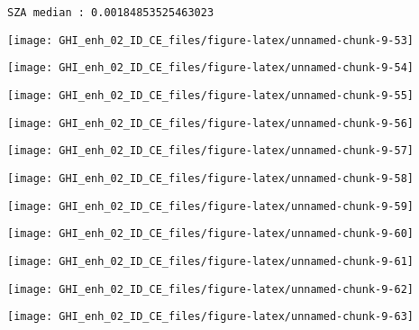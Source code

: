 \documentclass[
  10pt,
  a4paper,oneside]{article}
\begin{document}
\begin{verbatim}
SZA median : 0.00184853525463023 
\end{verbatim}

\begin{center}\texttt{[image: GHI\_enh\_02\_ID\_CE\_files/figure-latex/unnamed-chunk-9-53]} \end{center}

\begin{center}\texttt{[image: GHI\_enh\_02\_ID\_CE\_files/figure-latex/unnamed-chunk-9-54]} \end{center}

\begin{center}\texttt{[image: GHI\_enh\_02\_ID\_CE\_files/figure-latex/unnamed-chunk-9-55]} \end{center}

\begin{center}\texttt{[image: GHI\_enh\_02\_ID\_CE\_files/figure-latex/unnamed-chunk-9-56]} \end{center}

\begin{center}\texttt{[image: GHI\_enh\_02\_ID\_CE\_files/figure-latex/unnamed-chunk-9-57]} \end{center}

\begin{center}\texttt{[image: GHI\_enh\_02\_ID\_CE\_files/figure-latex/unnamed-chunk-9-58]} \end{center}

\begin{center}\texttt{[image: GHI\_enh\_02\_ID\_CE\_files/figure-latex/unnamed-chunk-9-59]} \end{center}

\begin{center}\texttt{[image: GHI\_enh\_02\_ID\_CE\_files/figure-latex/unnamed-chunk-9-60]} \end{center}

\begin{center}\texttt{[image: GHI\_enh\_02\_ID\_CE\_files/figure-latex/unnamed-chunk-9-61]} \end{center}

\begin{center}\texttt{[image: GHI\_enh\_02\_ID\_CE\_files/figure-latex/unnamed-chunk-9-62]} \end{center}

\begin{center}\texttt{[image: GHI\_enh\_02\_ID\_CE\_files/figure-latex/unnamed-chunk-9-63]} \end{center}
\end{document}
